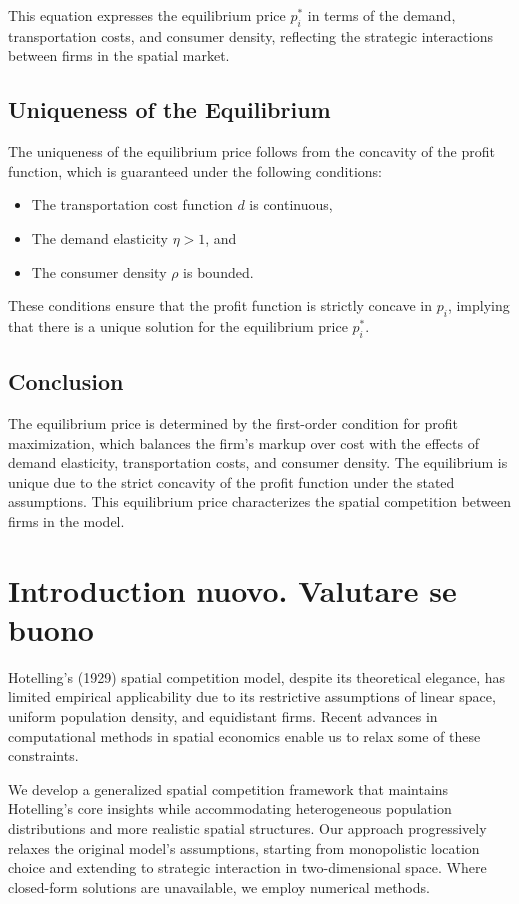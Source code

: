 This equation expresses the equilibrium price \( p_i^* \) in terms of the demand, transportation costs, and consumer density, reflecting the strategic interactions between firms in the spatial market.

\subsection*{Uniqueness of the Equilibrium}

The uniqueness of the equilibrium price follows from the concavity of the profit function, which is guaranteed under the following conditions:

\begin{itemize}
    \item The transportation cost function \( d \) is continuous,
    \item The demand elasticity \( \eta > 1 \), and
    \item The consumer density \( \rho \) is bounded.
\end{itemize}

These conditions ensure that the profit function is strictly concave in \( p_i \), implying that there is a unique solution for the equilibrium price \( p_i^* \).

\subsection*{Conclusion}

The equilibrium price is determined by the first-order condition for profit maximization, which balances the firm's markup over cost with the effects of demand elasticity, transportation costs, and consumer density. The equilibrium is unique due to the strict concavity of the profit function under the stated assumptions. This equilibrium price characterizes the spatial competition between firms in the model.
\section{Introduction nuovo. Valutare se buono}

Hotelling's (1929) spatial competition model, despite its theoretical elegance, has limited empirical applicability due to its restrictive assumptions of linear space, uniform population density, and equidistant firms. Recent advances in computational methods in spatial economics enable us to relax some of these constraints.

We develop a generalized spatial competition framework that maintains Hotelling's core insights while accommodating heterogeneous population distributions and more realistic spatial structures. Our approach progressively relaxes the original model's assumptions, starting from monopolistic location choice and extending to strategic interaction in two-dimensional space. Where closed-form solutions are unavailable, we employ numerical methods.

